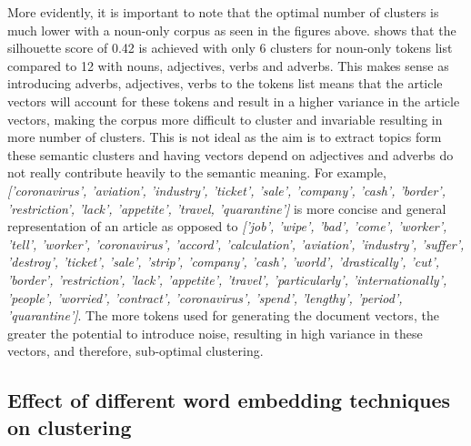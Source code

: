 More evidently, it is important to note that the optimal number of clusters is much lower with a noun-only corpus as seen in the figures above.  shows that the silhouette score of 0.42 is achieved with only 6 clusters for noun-only tokens list compared to 12 with nouns, adjectives, verbs and adverbs. This makes sense as introducing adverbs, adjectives, verbs to the tokens list means that the article vectors will account for these tokens and result in a higher variance in the article vectors, making the corpus more difficult to cluster and invariable resulting in more number of clusters. This is not ideal as the aim is to extract topics form these semantic clusters and having vectors depend on adjectives and adverbs do not really contribute heavily to the semantic meaning. For example, \textit{['coronavirus', 'aviation', 'industry', 'ticket', 'sale', 'company', 'cash', 'border', 'restriction', 'lack', 'appetite', 'travel, 'quarantine']} is more concise and general representation of an article as opposed to \textit{['job', 'wipe', 'bad', 'come', 'worker', 'tell', 'worker', 'coronavirus', 'accord', 'calculation', 'aviation', 'industry', 'suffer', 'destroy', 'ticket', 'sale', 'strip', 'company', 'cash', 'world', 'drastically', 'cut', 'border', 'restriction', 'lack', 'appetite', 'travel', 'particularly', 'internationally', 'people', 'worried', 'contract', 'coronavirus', 'spend', 'lengthy', 'period', 'quarantine']}. The more tokens used for generating the document vectors, the greater the potential to introduce noise, resulting in high variance in these vectors, and therefore, sub-optimal clustering. 


\subsection{Effect of different word embedding techniques on clustering} \label{s:word_embeddings}

